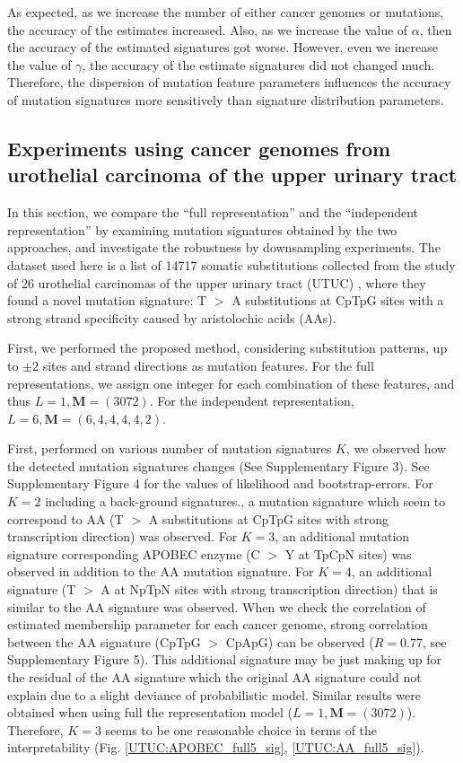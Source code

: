 As expected, as we increase the number of either cancer genomes or mutations, the accuracy of the estimates increased.
Also, as we increase the value of $\alpha$, then the accuracy of the estimated signatures got worse.
However, even we increase the value of $\gamma$, the accuracy of the estimate signatures did not changed much.
Therefore, the dispersion of mutation feature parameters influences the accuracy of mutation signatures
more sensitively than signature distribution parameters.


\subsection*{Experiments using cancer genomes from urothelial carcinoma of the upper urinary tract}

In this section, we compare the ``full representation'' and the ``independent representation'' by examining mutation signatures obtained by the two approaches,
and investigate the robustness by downsampling experiments.
The dataset used here is a list of 14717 somatic substitutions 
collected from the study of 26 urothelial carcinomas of the upper urinary tract (UTUC) \cite{pmid23926200},
where they found a novel mutation signature: 
T $>$ A substitutions at CpTpG sites with a strong strand specificity caused by aristolochic acids (AAs).

First, we performed the proposed method,
considering substitution patterns, up to $\pm 2$ sites and strand directions as mutation features.
For the full representations, we assign one integer for each combination of these features, and thus $L = 1, \bm{M} = (3072)$.
For the independent representation, $L = 6, \bm{M} = (6, 4, 4, 4, 4, 2)$.

First, performed on various number of mutation signatures $K$, we observed how the detected mutation signatures changes (See Supplementary Figure 3).
See Supplementary Figure 4 for the values of likelihood and bootstrap-errors.
For $K = 2$ including a back-ground signatures., a mutation signature which seem to correspond to AA  (T $>$ A substitutions at CpTpG sites with strong transcription direction) was observed.
For $K = 3$, an additional mutation signature corresponding APOBEC enzyme (C $>$ Y at TpCpN sites) was observed
in addition to the AA mutation signature.
For $K = 4$, an additional signature (T $>$ A at NpTpN sites with strong transcription direction) 
that is similar to the AA signature was observed. 
When we check the correlation of estimated membership parameter for each cancer genome, 
strong correlation between the AA signature (CpTpG $>$ CpApG) can be observed ($R = 0.77$, see Supplementary Figure 5). 
This additional signature may be just making up for the residual of the AA signature 
which the original AA signature could not explain due to a slight deviance of probabilistic model.
Similar results were obtained when using full the representation model ($L = 1, \bm{M} = (3072)$).
Therefore, $K = 3$ seems to be one reasonable choice in terms of the interpretability
(Fig. \ref{UTUC:APOBEC_full5_sig}, \ref{UTUC:AA_full5_sig}).

